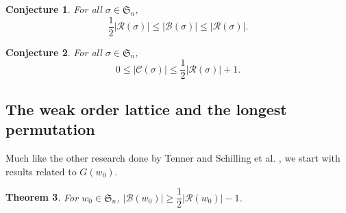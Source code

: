 \documentclass[11pt,reqno]{amsart}
\newtheorem{theorem}{Theorem}[section]
\newtheorem{conjecture}[theorem]{Conjecture}
\theoremstyle{definition}
\theoremstyle{notation}
\newcommand{\calR}{\mathcal{R}}
\newcommand{\calB}{\mathcal{B}}
\newcommand{\calC}{\mathcal{C}}
\begin{document}
\begin{conjecture}\label{braidclassratio}
For all $\sigma\in \mathfrak{S}_n$,
\[
 \dfrac{1}{2} |\calR(\sigma)| \leq |\calB(\sigma )|\leq |\calR(\sigma)|.
\]
\end{conjecture}


\begin{conjecture}\label{commclassratio}
For all $\sigma\in \mathfrak{S}_n$, %
\[
0\leq |\calC(\sigma)| \leq \dfrac{1}{2}|\calR(\sigma)| + 1.
\]
\end{conjecture}


\subsection{The weak order lattice and the longest permutation}%
Much like the other research done by Tenner \cite{T2} and Schilling et al. \cite{Sch}, we start with results related to $G(w_0)$.


\begin{theorem}\label{weakerV}
For $w_0\in \mathfrak{S}_n$, $|\calB(w_0)|\geq \dfrac{1}{2}|\calR(w_0)|-1$. 
\end{theorem}
\end{document}
